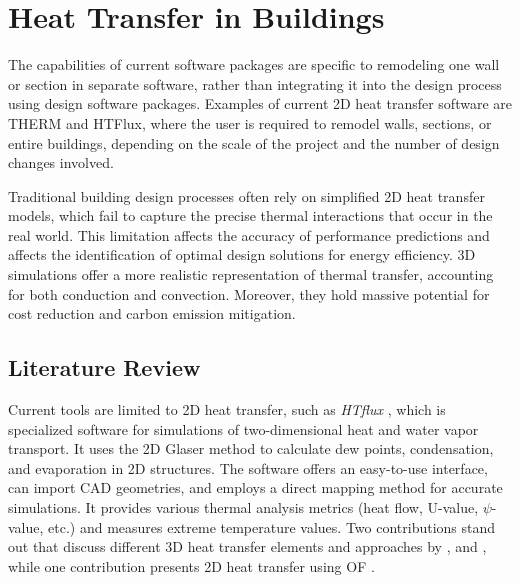 \chapter{Heat Transfer in Buildings}



The capabilities of current software packages are specific to remodeling one wall or section in separate software, rather than integrating it into the design process using design software packages. Examples of current 2D heat transfer software are THERM and HTFlux, where
the user is required to remodel walls, sections, or entire buildings, depending on the scale of the project and the number of design changes involved.

Traditional building design processes often rely on simplified 2D heat transfer models, which fail to capture the precise thermal interactions that occur in the real world. This limitation affects the accuracy of performance predictions and affects the identification of optimal design solutions for energy efficiency. 
3D simulations offer a more realistic representation of thermal transfer, accounting for both conduction and convection. 
Moreover, they hold massive potential for cost reduction and carbon emission mitigation. 






\section{Literature Review}






Current tools are limited to 2D heat transfer, such as \textit{HTflux} \cite{HTflux}, which is specialized software for simulations of two-dimensional heat and water vapor transport.
It uses the 2D Glaser method \cite{glaser1959graphisches} to calculate dew points, condensation, and evaporation in 2D structures. 
The software offers an easy-to-use interface, can import CAD geometries, and employs a direct mapping method for accurate simulations. 
It provides various thermal analysis metrics (heat flow, U-value, $\psi$-value, etc.) and measures extreme temperature values. Two contributions stand out that discuss different 3D heat transfer elements and approaches by  \cite{Yang}, and \cite{COMSOL}, while one contribution presents 2D heat transfer using \gls{OF} \cite{kastner2020solving}.


